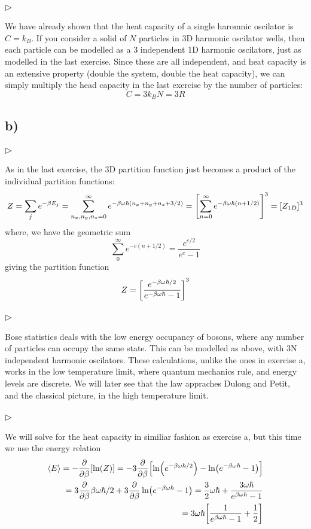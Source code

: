 \documentclass[12p,a4paper]{article}
\renewcommand{\exp}{e^}
\renewcommand{\exp}{e^}
\begin{document}
\subsubsection*{$\rhd$}
We have already shown that the heat capacity of a single haromnic oscilator is $C = k_B$. If you consider a solid of $N$ particles in 3D harmonic oscilator wells, then each particle can be modelled as a 3 independent 1D harmonic oscilators, just as modelled in the last exercise. Since these are all independent, and heat capacity is an extensive property (double the system, double the heat capacity), we can simply multiply the head capacity in the last exercise by the number of particles:
\[
    C = 3k_BN = 3R
\]



\subsection*{b)}
\subsubsection*{$\rhd$}
As in the last exercise, the 3D partition function just becomes a product of the individual partition functions:
\[
    Z = \sum_j \exp{-\beta E_j} = \sum_{n_x,n_y,n_z = 0}^{\infty} \exp{-\beta \omega\hbar(n_x + n_y + n_z + 3/2)} = \qty[\sum_{n = 0}^{\infty} \exp{-\beta \omega\hbar(n + 1/2)}]^3 = [Z_{1D}]^3
\]
where, we have the geometric sum
\[
    \sum_{0}^\infty \exp{-c(n+1/2)} = \frac{\exp{c/2}}{\exp{c} - 1}
\]
giving the partition function
\[
    Z = \qty[\frac{\exp{-\beta\omega\hbar/2}}{\exp{-\beta\omega\hbar} - 1}]^3
\]



\subsubsection*{$\rhd$}
Bose statistics deals with the low energy occupancy of bosons, where any number of particles can occupy the same state. This can be modelled as above, with 3N independent harmonic oscilators. These calculations, unlike the ones in exercise a, works in the low temperature limit, where quantum mechanics rule, and energy levels are discrete. We will later see that the law appraches Dulong and Petit, and the classical picture, in the high temperature limit.



\subsubsection*{$\rhd$}
We will solve for the heat capacity in similiar fashion as exercise a, but this time we use the energy relation
\begin{align*}
    \langle E \rangle = -\pdv{\beta}\qty[\ln(Z)] = -3\pdv{\beta}\qty[\ln(\exp{-\beta\omega\hbar/2}) - \ln(\exp{-\beta\omega\hbar} - 1)] \\
    = 3\pdv{\beta}\beta\omega\hbar/2 + 3\pdv{\beta}\ln(\exp{-\beta\omega\hbar} - 1)
    = \frac{3}{2}\omega\hbar + \frac{3\omega\hbar}{\exp{\beta\omega\hbar} - 1}\\
    = 3\omega\hbar\qty[\frac{1}{\exp{\beta\omega\hbar} - 1} + \frac{1}{2}]
\end{align*}
\end{document}
